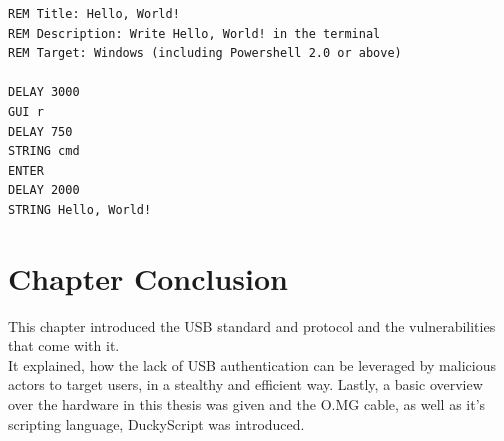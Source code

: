 \begin{verbatim}
REM Title: Hello, World!
REM Description: Write Hello, World! in the terminal
REM Target: Windows (including Powershell 2.0 or above)

DELAY 3000
GUI r
DELAY 750
STRING cmd
ENTER
DELAY 2000
STRING Hello, World!
\end{verbatim}



\section{Chapter Conclusion}

This chapter introduced the USB standard and protocol and the vulnerabilities that come with it. \\
It explained, how the lack of USB authentication can be leveraged by malicious actors to target users, in a stealthy and efficient way. 
Lastly, a basic overview over the hardware in this thesis was given and the O.MG cable, as well as it's scripting language, DuckyScript was introduced. 